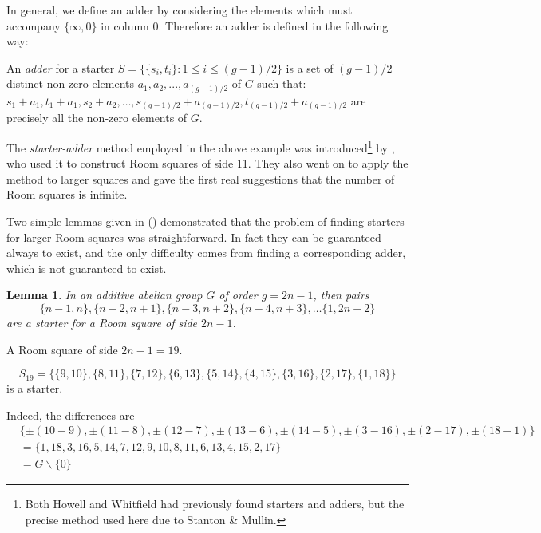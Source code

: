 \documentclass[
  11pt,
  a4paper]{book}
\newtheorem{lemma}[theorem]{Lemma}
\newcounter{example}
\begin{document}
In general, we define an adder by considering the elements which must
accompany \(\{\infty, 0\}\) in column 0. Therefore an adder is defined
in the following way:

An \emph{adder} for a starter
\(S = \{\{s_i, t_i\}: 1 \leq i \leq (g - 1)/2 \}\) is a set of
\((g - 1)/2\) distinct non-zero elements
\(a_1, a_2, ..., a_{(g - 1)/2}\) of \(G\) such that:
\(s_1 + a_1, t_1 + a_1, s_2 + a_2, \ldots, s_{(g - 1)/2} + a_{(g - 1)/2}, t_{(g - 1)/2} + a_{(g - 1)/2}\)
are precisely all the non-zero elements of \(G\).

The \emph{starter-adder} method employed in the above example was
introduced\footnote{Both Howell and Whitfield had previously found
  starters and adders, but the precise method used here due to Stanton
  \& Mullin.} by \textcite{stanton_construction_1968}, who used it to
construct Room squares of side 11. They also went on to apply the method
to larger squares and gave the first real suggestions that the number of
Room squares is infinite.

Two simple lemmas given in (\textcite{stanton_construction_1968})
demonstrated that the problem of finding starters for larger Room
squares was straightforward. In fact they can be guaranteed always to
exist, and the only difficulty comes from finding a corresponding adder,
which is not guaranteed to exist.

\begin{lemma}
In an additive abelian group $G$ of order $g = 2n-1$,
then pairs
\begin{equation*}
  \{n - 1, n\}, \{n - 2, n + 1\}, \{n - 3, n + 2\}, \{n - 4, n + 3\}, \ldots\{1, 2n - 2\}
\end{equation*}
are a starter for a Room square of side $2n - 1$.
\end{lemma}

\begin{example}
A Room square of side $2n - 1 = 19$.

\begin{equation*}
S_{19} = \{\{9, 10\}, \{8, 11\}, \{7, 12\}, \{6, 13\}, \{5, 14\}, \{4, 15\}, \{3, 16\}, \{2, 17\}, \{1, 18\}\}
\end{equation*}
is a starter.

Indeed, the differences are
\begin{equation*}
\begin{split}
  & \{\pm(10 - 9), \pm(11 - 8), \pm(12 - 7), \pm(13 - 6), \pm(14 - 5), \pm(3 - 16), \pm(2 - 17), \pm(18 - 1)\} \\ 
  &= \{1, 18, 3, 16, 5, 14, 7, 12, 9, 10, 8, 11, 6, 13, 4, 15, 2, 17\} \\
  &= G \backslash \{0\}
\end{split}
\end{equation*}
\end{example}
\end{document}
